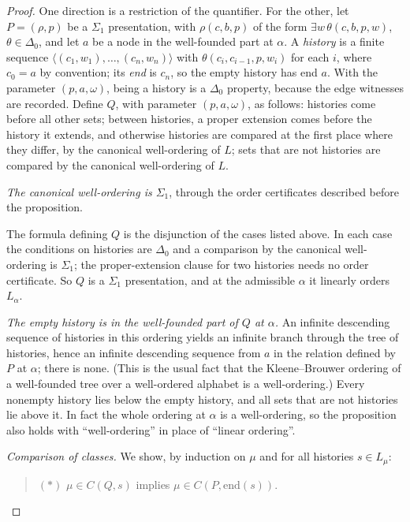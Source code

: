 \documentclass[11pt]{article}
\begin{document}
\begin{proof}
One direction is a restriction of the quantifier. For the other, let $P = (\rho, p)$ be a $\Sigma_1$ presentation,
with $\rho(c, b, p)$ of the form $\exists w\, \theta(c, b, p, w)$, $\theta \in \Delta_0$, and let $a$ be a node in the
well-founded part at $\alpha$. A \emph{history} is a finite sequence
$\langle (c_1, w_1), \dots, (c_n, w_n) \rangle$ with $\theta(c_i, c_{i-1}, p, w_i)$ for each $i$, where $c_0 = a$ by
convention; its \emph{end} is $c_n$, so the empty history has end $a$. With the parameter $(p, a, \omega)$, being a
history is a $\Delta_0$ property, because the edge witnesses are recorded. Define $Q$, with parameter
$(p, a, \omega)$, as follows: histories come before all other sets; between histories, a proper extension comes
before the history it extends, and otherwise histories are compared at the first place where they differ, by the
canonical well-ordering of $L$; sets that are not histories are compared by the canonical well-ordering of $L$.

\emph{The canonical well-ordering is $\Sigma_1$}, through the order certificates described before the proposition.

The formula defining $Q$ is the disjunction of the cases listed above. In each case the conditions on histories are
$\Delta_0$ and a comparison by the canonical well-ordering is $\Sigma_1$; the proper-extension clause for two
histories needs no order certificate. So $Q$ is a $\Sigma_1$ presentation, and at the admissible $\alpha$ it linearly
orders $L_{\alpha}$.

\emph{The empty history is in the well-founded part of $Q$ at $\alpha$.} An infinite descending sequence of histories
in this ordering yields an infinite branch through the tree of histories, hence an infinite descending sequence from
$a$ in the relation defined by $P$ at $\alpha$; there is none. (This is the usual fact that the Kleene--Brouwer
ordering of a well-founded tree over a well-ordered alphabet is a well-ordering.) Every nonempty history lies below the
empty history, and all sets that are not histories lie above it. In fact the whole ordering at $\alpha$ is a
well-ordering, so the proposition also holds with ``well-ordering'' in place of ``linear ordering''.

\emph{Comparison of classes.} We show, by induction on $\mu$ and for all histories $s \in L_{\mu}$:

\begin{quote}
$(\ast)$ $\mu \in C(Q, s)$ implies $\mu \in C(P, \mathrm{end}(s))$.
\end{quote}


\end{proof}
\end{document}
